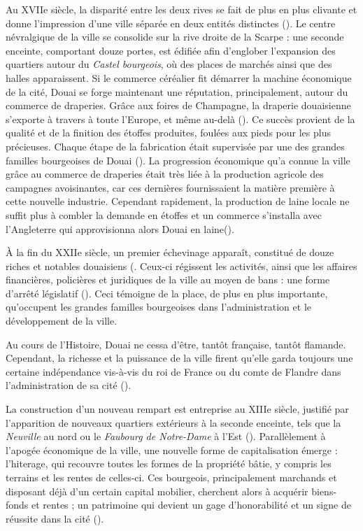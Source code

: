 Au XVIIe siècle, la disparité entre les deux rives se fait de plus en plus clivante et donne l'impression d'une ville séparée en deux entités distinctes (\cite{leroy-langelin_quartier_2012}). 
Le centre névralgique de la ville se consolide sur la rive droite de la Scarpe : une seconde enceinte, comportant douze portes, est édifiée afin d'englober l'expansion des quartiers autour du \textit{Castel bourgeois}, où des places de marchés ainsi que des halles apparaissent. 
Si le commerce céréalier fit démarrer la machine économique de la cité, Douai se forge maintenant une réputation, principalement, autour du commerce de draperies. Grâce aux foires de Champagne, la draperie douaisienne s'exporte à travers à toute l'Europe, et même au-delà (\cite{clisant_vie_2003}). Ce succès provient de la qualité et de la finition des étoffes produites, foulées aux pieds pour les plus précieuses. Chaque étape de la fabrication était supervisée par une des grandes familles bourgeoises de Douai (\cite{clisant_vie_2003}).
La progression économique qu'a connue la ville grâce au commerce de draperies était très liée à la production agricole des campagnes avoisinantes, car ces dernières fournissaient la matière première à cette nouvelle industrie.
Cependant rapidement, la production de laine locale ne suffit plus à combler la demande en étoffes et un commerce s'installa avec l'Angleterre qui approvisionna alors Douai en laine(\cite{clisant_vie_2003}).

À la fin du XXIIe siècle, un premier échevinage apparaît, constitué de douze riches et notables douaisiens (\cite{mestayer_douai_2016}. Ceux-ci régissent les activités, ainsi que les affaires financières, policières et juridiques  de la ville au moyen de bans : une forme d'arrêté législatif (\cite{officedutourisme_douai_2016}). Ceci témoigne de la place, de plus en plus importante, qu'occupent les grandes familles bourgeoises dans l'administration et le développement de la ville.

Au cours de l'Histoire, Douai ne cessa d'être, tantôt française, tantôt flamande. Cependant, la richesse et la puissance de la ville firent  qu'elle garda toujours une certaine indépendance vis-à-vis du roi de France ou du comte de Flandre dans l'administration de sa cité (\cite{mestayer_douai_2016}).

La construction d'un nouveau rempart est entreprise au XIIIe siècle, justifié par l'apparition de nouveaux quartiers extérieurs à la seconde enceinte, tels que la \textit{Neuville} au  nord ou le \textit{Faubourg de Notre-Dame} à l'Est (\cite{netteghem_histoire_2021}).
Parallèlement à l'apogée économique de la ville, une nouvelle forme de capitalisation émerge : l'hiterage, qui recouvre toutes les formes de la propriété bâtie, y compris les terrains et les rentes de celles-ci. Ces bourgeois, principalement marchands et disposant déjà d'un certain capital mobilier, cherchent alors à acquérir biens-fonds et rentes ; un patrimoine qui devient un gage d'honorabilité et un signe de réussite dans la cité  (\cite{leguay_propriete_1989}). 

